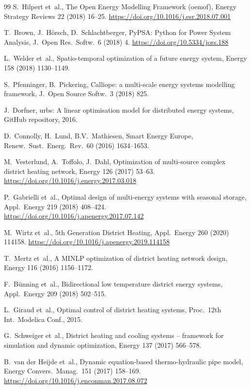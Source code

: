 \documentclass[review,3p]{elsarticle}
\begin{document}
\begin{thebibliography}{99}
S.~Hilpert et~al.,
The Open Energy Modelling Framework (oemof),
Energy Strategy Reviews 22 (2018) 16--25.
\url{https://doi.org/10.1016/j.esr.2018.07.001}

T.~Brown, J.~H\"{o}rsch, D.~Schlachtberger,
PyPSA: Python for Power System Analysis,
J.\ Open Res.\ Softw.\ 6 (2018) 4.
\url{https://doi.org/10.5334/jors.188}

L.~Welder et~al.,
Spatio-temporal optimization of a future energy system,
Energy 158 (2018) 1130--1149.

S.~Pfenninger, B.~Pickering,
Calliope: a multi-scale energy systems modelling framework,
J.\ Open Source Softw.\ 3 (2018) 825.

J.~Dorfner,
urbs: A linear optimisation model for distributed energy systems,
GitHub repository, 2016.

D.~Connolly, H.~Lund, B.V.~Mathiesen,
Smart Energy Europe,
Renew.\ Sust.\ Energ.\ Rev.\ 60 (2016) 1634--1653.

M.~Vesterlund, A.~Toffolo, J.~Dahl,
Optimization of multi-source complex district heating network,
Energy 126 (2017) 53--63.
\url{https://doi.org/10.1016/j.energy.2017.03.018}

P.~Gabrielli et~al.,
Optimal design of multi-energy systems with seasonal storage,
Appl.\ Energy 219 (2018) 408--424.
\url{https://doi.org/10.1016/j.apenergy.2017.07.142}

M.~Wirtz et~al.,
5th Generation District Heating,
Appl.\ Energy 260 (2020) 114158.
\url{https://doi.org/10.1016/j.apenergy.2019.114158}

T.~Mertz et~al.,
A MINLP optimization of district heating network design,
Energy 116 (2016) 1156--1172.

F.~B\"{u}nning et~al.,
Bidirectional low temperature district energy systems,
Appl.\ Energy 209 (2018) 502--515.

L.~Giraud et~al.,
Optimal control of district heating systems,
Proc.\ 12th Int.\ Modelica Conf., 2015.

G.~Schweiger et~al.,
District heating and cooling systems -- framework for simulation and
dynamic optimization,
Energy 137 (2017) 566--578.

B.~van der Heijde et~al.,
Dynamic equation-based thermo-hydraulic pipe model,
Energy Convers.\ Manag.\ 151 (2017) 158--169.
\url{https://doi.org/10.1016/j.enconman.2017.08.072}


\end{thebibliography}
\end{document}
